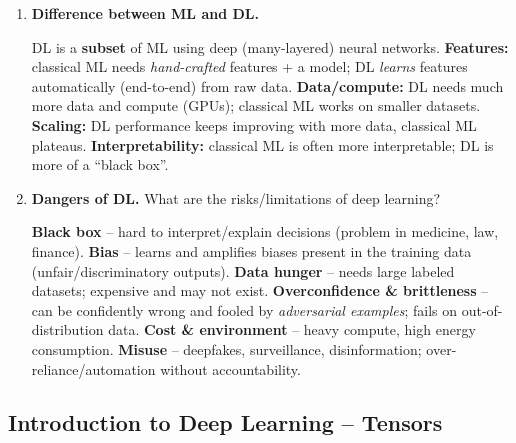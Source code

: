 \documentclass[10pt,a4paper]{article}
\newcommand{\q}[1]{\item #1}
\begin{document}
\begin{enumerate}[leftmargin=*,label=\textbf{Q\arabic*.}]
\q \textbf{Difference between ML and DL.}
\begin{answerbox}
DL is a \textbf{subset} of ML using deep (many-layered) neural networks.
\textbf{Features:} classical ML needs \emph{hand-crafted} features + a model; DL \emph{learns} features automatically (end-to-end) from raw data.
\textbf{Data/compute:} DL needs much more data and compute (GPUs); classical ML works on smaller datasets.
\textbf{Scaling:} DL performance keeps improving with more data, classical ML plateaus.
\textbf{Interpretability:} classical ML is often more interpretable; DL is more of a ``black box''.
\end{answerbox}

\q \textbf{Dangers of DL.} What are the risks/limitations of deep learning?
\begin{answerbox}
\textbf{Black box} -- hard to interpret/explain decisions (problem in medicine, law, finance).
\textbf{Bias} -- learns and amplifies biases present in the training data (unfair/discriminatory outputs).
\textbf{Data hunger} -- needs large labeled datasets; expensive and may not exist.
\textbf{Overconfidence \& brittleness} -- can be confidently wrong and fooled by \emph{adversarial examples}; fails on out-of-distribution data.
\textbf{Cost \& environment} -- heavy compute, high energy consumption.
\textbf{Misuse} -- deepfakes, surveillance, disinformation; over-reliance/automation without accountability.
\end{answerbox}

\end{enumerate}

\subsection{Introduction to Deep Learning -- Tensors}
\end{document}

